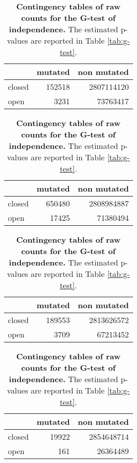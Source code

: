 \begin{table}[!htb]
    \caption{\textbf{Contingency tables of raw counts for the G-test of independence.} The estimated p-values are reported in Table \ref{tab:g-test}.}
    
    \begin{subtable}[!h]{.5\textwidth}
        \centering
        \begin{tabular}{ l r r }
        \bf{} & \bf{mutated} & \bf{non mutated} \\
        \hline
        closed &  152518 &  2807114120 \\
        open &    3231 &    73763417 \\
        \end{tabular}
        \vspace{0.2cm}
    \end{subtable} 
    \quad %
    \begin{subtable}[!h]{.5\textwidth}
        \centering
        \begin{tabular}{ l r r }
        \bf{} & \bf{mutated} & \bf{non mutated} \\
        \hline
        closed &  650480 &  2808984887 \\
        open &   17425 &    71380494 \\
        \end{tabular}
        \vspace{0.2cm}
    \end{subtable}  
    \vspace{0.5cm}
    
    \begin{subtable}[!h]{.5\textwidth}
        \centering
        \begin{tabular}{ l r r }
        \bf{} & \bf{mutated} & \bf{non mutated} \\
        \hline
        closed &  189553 &  2813626572 \\
        open &    3709 &    67213452 \\
        \end{tabular}
        \vspace{0.2cm}
    \end{subtable} 
    \quad %
    \begin{subtable}[!h]{.5\textwidth}
        \centering
        \begin{tabular}{ l r r }
        \bf{} & \bf{mutated} & \bf{non mutated} \\
        \hline
        closed &   19922 &  2854648714 \\
        open &     161 &    26364489 \\
        \end{tabular}
        \vspace{0.2cm}
    \end{subtable}  
    \vspace{0.5cm}
    

\end{table}
